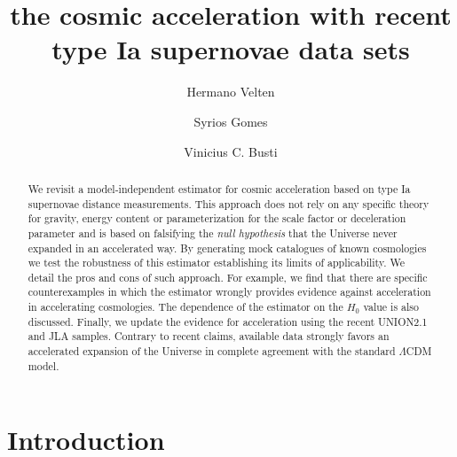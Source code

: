 \documentclass[nofootinbib,twocolumn]{revtex4}
\begin{document}
\title{ the cosmic acceleration with recent type Ia supernovae data sets}

\author{Hermano Velten}%
\author{Syrios Gomes}%

\author{Vinicius C. Busti}



\begin{abstract}
\noindent
We revisit a model-independent estimator for cosmic acceleration based on type Ia supernovae distance measurements. This approach does not rely on any specific theory for gravity, energy content or parameterization for the scale factor or deceleration parameter and is based on falsifying the {\it null hypothesis} that the Universe never expanded in an accelerated way. By generating mock catalogues of known cosmologies we test the robustness of this estimator establishing its limits of applicability. We detail the pros and cons of such approach. For example, we find that there are specific counterexamples in which the estimator wrongly provides evidence against acceleration in accelerating cosmologies. The dependence of the estimator on the $H_0$ value is also discussed. Finally, we update the evidence for acceleration using the recent UNION2.1 and JLA samples. Contrary to recent claims, available data strongly favors an accelerated expansion of the Universe in complete agreement with the standard $\Lambda$CDM model.
\end{abstract}


\maketitle

\section{Introduction}
\end{document}
